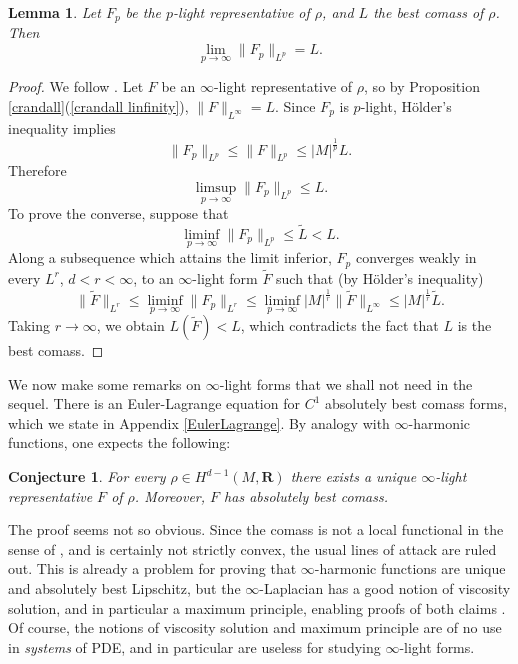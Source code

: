 \documentclass[reqno,11pt]{amsart}
\newcommand{\RR}{\mathbf{R}}
\newtheorem{lemma}[theorem]{Lemma}
\newtheorem{conjecture}[theorem]{Conjecture}
\theoremstyle{definition}
\numberwithin{equation}{section}
\begin{document}
\begin{lemma}\label{p lights approximate L}
Let $F_p$ be the $p$-light representative of $\rho$, and $L$ the best comass of $\rho$. Then 
$$\lim_{p \to \infty} \|F_p\|_{L^p} = L.$$
\end{lemma}
\begin{proof}
We follow \cite[Lemma 2.7]{daskalopoulos2020transverse}.
Let $F$ be an $\infty$-light representative of $\rho$, so by Proposition \ref{crandall}(\ref{crandall linfinity}), $\|F\|_{L^\infty} = L$.
Since $F_p$ is $p$-light, H\"older's inequality implies 
$$\|F_p\|_{L^p} \leq \|F\|_{L^p} \leq |M|^{\frac{1}{p}} L.$$
Therefore 
$$\limsup_{p \to \infty} \|F_p\|_{L^p} \leq L.$$
To prove the converse, suppose that 
$$\liminf_{p \to \infty} \|F_p\|_{L^p} \leq \tilde L < L.$$
Along a subsequence which attains the limit inferior, $F_p$ converges weakly in every $L^r$, $d < r < \infty$, to an $\infty$-light form $\tilde F$ such that (by H\"older's inequality)
$$\|\tilde F\|_{L^r} \leq \liminf_{p \to \infty} \|F_p\|_{L^r} \leq \liminf_{p \to \infty} |M|^{\frac{1}{r}} \|\tilde F\|_{L^\infty} \leq |M|^{\frac{1}{r}} \tilde L.$$
Taking $r \to \infty$, we obtain $L(\tilde F) < L$, which contradicts the fact that $L$ is the best comass.
\end{proof}

We now make some remarks on $\infty$-light forms that we shall not need in the sequel.
There is an Euler-Lagrange equation for $C^1$ absolutely best comass forms, which we state in Appendix \ref{EulerLagrange}.
By analogy with $\infty$-harmonic functions, one expects the following:

\begin{conjecture}
For every $\rho \in H^{d - 1}(M, \RR)$ there exists a unique $\infty$-light representative $F$ of $\rho$.
Moreover, $F$ has absolutely best comass.
\end{conjecture}

The proof seems not so obvious.
Since the comass is not a local functional in the sense of \cite{Crandall2008}, and is certainly not strictly convex, the usual lines of attack are ruled out.
This is already a problem for proving that $\infty$-harmonic functions are unique and absolutely best Lipschitz, but the $\infty$-Laplacian has a good notion of viscosity solution, and in particular a maximum principle, enabling proofs of both claims \cite{Lindqvist14}.
Of course, the notions of viscosity solution and maximum principle are of no use in \emph{systems} of PDE, and in particular are useless for studying $\infty$-light forms.
\end{document}
